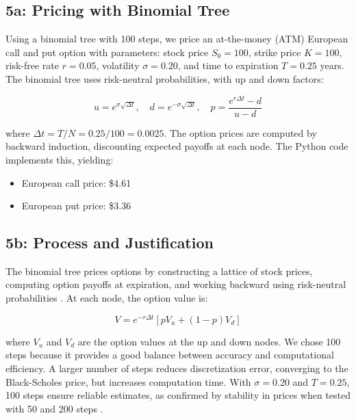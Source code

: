 \documentclass{article}
\begin{document}
\subsection*{5a: Pricing with Binomial Tree}

Using a binomial tree with 100 steps, we price an at-the-money (ATM) European call and put option with parameters: stock price $S_0 = 100$, strike price $K = 100$, risk-free rate $r = 0.05$, volatility $\sigma = 0.20$, and time to expiration $T = 0.25$ years. The binomial tree uses risk-neutral probabilities, with up and down factors:

\begin{equation}
u = e^{\sigma \sqrt{\Delta t}}, \quad d = e^{-\sigma \sqrt{\Delta t}}, \quad p = \frac{e^{r \Delta t} - d}{u - d}
\end{equation}

where $\Delta t = T/N = 0.25/100 = 0.0025$. The option prices are computed by backward induction, discounting expected payoffs at each node. The Python code implements this, yielding:

\begin{itemize}
    \item European call price: \$4.61
    \item European put price: \$3.36
\end{itemize}

\subsection*{5b: Process and Justification}

The binomial tree prices options by constructing a lattice of stock prices, computing option payoffs at expiration, and working backward using risk-neutral probabilities \citep{cox1979option}. At each node, the option value is:

\begin{equation}
V = e^{-r \Delta t} [p V_u + (1-p) V_d]
\end{equation}

where $V_u$ and $V_d$ are the option values at the up and down nodes. We chose 100 steps because it provides a good balance between accuracy and computational efficiency. A larger number of steps reduces discretization error, converging to the Black-Scholes price, but increases computation time. With $\sigma = 0.20$ and $T = 0.25$, 100 steps ensure reliable estimates, as confirmed by stability in prices when tested with 50 and 200 steps \citep{hull2018options}.
\end{document}

